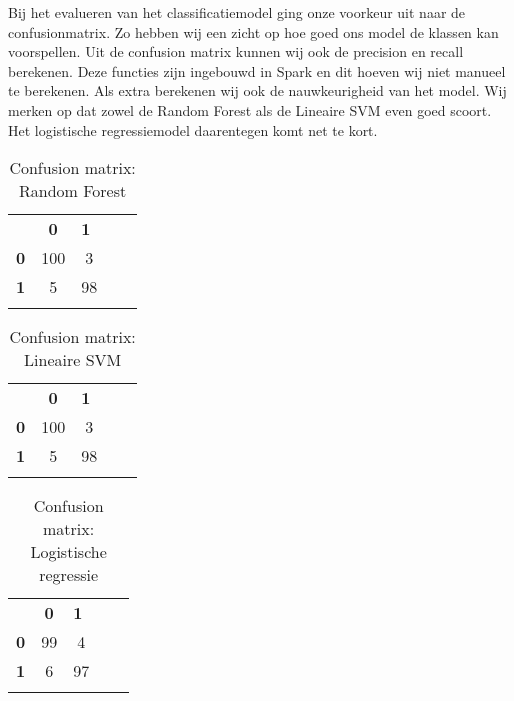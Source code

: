 \documentclass[a4paper,12pt,twoside]{report}
\begin{document}
Bij het evalueren van het classificatiemodel ging onze voorkeur uit naar de confusionmatrix. Zo hebben wij een zicht op hoe goed ons model de klassen kan voorspellen. Uit de confusion matrix kunnen wij ook de precision en recall berekenen. Deze functies zijn ingebouwd in Spark en dit hoeven wij niet manueel te berekenen. Als extra berekenen wij ook de nauwkeurigheid van het model. Wij merken op dat zowel de Random Forest als de Lineaire SVM even goed scoort. Het logistische regressiemodel daarentegen komt net te kort.

\begin{table}[]
    \caption{Confusion matrix: Random Forest}
    \label{tab:my-table}
    \begin{tabular}{lclll}
    \multicolumn{1}{c}{\textbf{}}   & \textbf{0}               & \textbf{1}              &  &  \\ \cline{2-3}
    \multicolumn{1}{c|}{\textbf{0}} & \multicolumn{1}{c|}{100} & \multicolumn{1}{c|}{3}  &  &  \\ \cline{2-3}
    \multicolumn{1}{l|}{\textbf{1}} & \multicolumn{1}{c|}{5}   & \multicolumn{1}{c|}{98} &  &  \\ \cline{2-3}
                                    & \multicolumn{1}{l}{}     &                         &  & 
    \end{tabular}
\end{table}

\begin{table}[]
    \caption{Confusion matrix: Lineaire SVM}
    \label{tab:my-table}
    \begin{tabular}{lclll}
    \multicolumn{1}{c}{\textbf{}}   & \textbf{0}               & \textbf{1}              &  &  \\ \cline{2-3}
    \multicolumn{1}{c|}{\textbf{0}} & \multicolumn{1}{c|}{100} & \multicolumn{1}{c|}{3}  &  &  \\ \cline{2-3}
    \multicolumn{1}{l|}{\textbf{1}} & \multicolumn{1}{c|}{5}   & \multicolumn{1}{c|}{98} &  &  \\ \cline{2-3}
                                    & \multicolumn{1}{l}{}     &                         &  & 
    \end{tabular}
\end{table}

\begin{table}[]
    \caption{Confusion matrix: Logistische regressie}
    \label{tab:my-table}
    \begin{tabular}{lclll}
    \multicolumn{1}{c}{\textbf{}}   & \textbf{0}              & \textbf{1}              &  &  \\ \cline{2-3}
    \multicolumn{1}{c|}{\textbf{0}} & \multicolumn{1}{c|}{99} & \multicolumn{1}{c|}{4}  &  &  \\ \cline{2-3}
    \multicolumn{1}{l|}{\textbf{1}} & \multicolumn{1}{c|}{6}  & \multicolumn{1}{c|}{97} &  &  \\ \cline{2-3}
                                    & \multicolumn{1}{l}{}    &                         &  & 
    \end{tabular}
\end{table}
\end{document}
